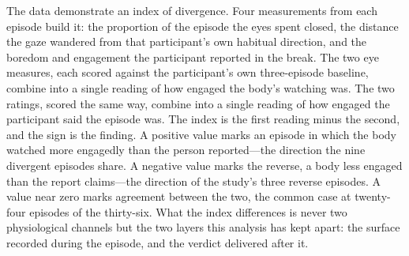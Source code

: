 
The data demonstrate an index of divergence. Four measurements from each episode build it:
the proportion of the episode the eyes spent closed, the distance the gaze wandered from that
participant's own habitual direction, and the boredom and engagement the participant reported
in the break. The two eye measures, each scored against the participant's own three-episode
baseline, combine into a single reading of how engaged the body's watching was. The two
ratings, scored the same way, combine into a single reading of how engaged the participant
said the episode was. The index is the first reading minus the second, and the sign is the
finding. A positive value marks an episode in which the body watched more engagedly than the
person reported---the direction the nine divergent episodes share. A negative value marks the
reverse, a body less engaged than the report claims---the direction of the study's three
reverse episodes. A value near zero marks agreement between the two, the common case at
twenty-four episodes of the thirty-six. What the index differences is never two physiological
channels but the two layers this analysis has kept apart: the surface recorded during the
episode, and the verdict delivered after it.

